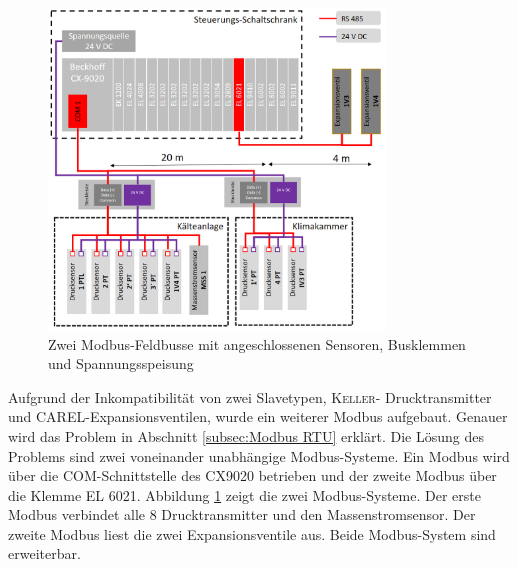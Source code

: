 \begin{figure}[htb]
\centering	
	\includegraphics[page= 2, width=0.8\textwidth]{Pictures/ModbusVerkabelung.png}
\caption{Zwei Modbus-Feldbusse mit angeschlossenen Sensoren, Busklemmen und Spannungsspeisung}
\label{fig:ModbusVerkabelung}
\end{figure}
 
 
  Aufgrund der Inkompatibilität von zwei Slavetypen, \textsc{Keller}- Drucktransmitter und \textsc{CAREL}-Expansionsventilen, wurde ein weiterer Modbus aufgebaut. Genauer wird das Problem in Abschnitt \ref{subsec:Modbus RTU} erklärt. Die Lösung des Problems sind zwei voneinander unabhängige Modbus-Systeme. Ein Modbus wird über die COM-Schnittstelle des CX9020 betrieben und der zweite Modbus über die Klemme EL 6021. Abbildung \ref{fig:ModbusVerkabelung} zeigt die zwei Modbus-Systeme. Der erste Modbus verbindet alle 8 Drucktransmitter und den Massenstromsensor. Der zweite Modbus liest die zwei Expansionsventile aus. Beide Modbus-System sind erweiterbar. 


